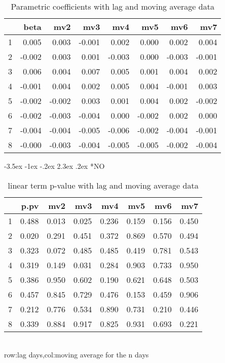 \documentclass[a4paper, 12pt]{article}
\makeatletter
\def\large{\fontsize{14}{20}\selectfont}
\renewcommand\subsection{\@startsection {subsection}{1}{\z@}%
                                   {-3.5ex \@plus -1ex \@minus -.2ex}%
                                   {2.3ex \@plus.2ex}%
                                   {\centering\normalfont\large\bfseries}}
\makeatother
\begin{document}
\begin{table}[h]
\centering
\caption{Parametric coefficients with lag and moving average data}
\begin{tabular}{rrrrrrrr}
  \hline
 & beta & mv2 & mv3 & mv4 & mv5 & mv6 & mv7 \\
  \hline
1 & 0.005 & 0.003 & -0.001 & 0.002 & 0.000 & 0.002 & 0.004 \\
  2 & -0.002 & 0.003 & 0.001 & -0.003 & 0.000 & -0.003 & -0.001 \\
  3 & 0.006 & 0.004 & 0.007 & 0.005 & 0.001 & 0.004 & 0.002 \\
  4 & -0.001 & 0.004 & 0.002 & 0.005 & 0.004 & -0.001 & 0.003 \\
  5 & -0.002 & -0.002 & 0.003 & 0.001 & 0.004 & 0.002 & -0.002 \\
  6 & -0.002 & -0.003 & -0.004 & 0.000 & -0.002 & 0.002 & 0.000 \\
  7 & -0.004 & -0.004 & -0.005 & -0.006 & -0.002 & -0.004 & -0.001 \\
  8 & -0.000 & -0.003 & -0.004 & -0.005 & -0.005 & -0.002 & -0.004 \\
   \hline
\end{tabular}
\end{table}
\clearpage
\subsection*{NO}
\begin{table}[h]
\centering
\caption{linear term p-value with lag and moving average data}
\begin{tabular}{rrrrrrrr}
  \hline
 & p.pv & mv2 & mv3 & mv4 & mv5 & mv6 & mv7 \\
  \hline
1 & 0.488 & 0.013 & 0.025 & 0.236 & 0.159 & 0.156 & 0.450 \\
  2 & 0.020 & 0.291 & 0.451 & 0.372 & 0.869 & 0.570 & 0.494 \\
  3 & 0.323 & 0.072 & 0.485 & 0.485 & 0.419 & 0.781 & 0.543 \\
  4 & 0.319 & 0.149 & 0.031 & 0.284 & 0.903 & 0.733 & 0.950 \\
  5 & 0.386 & 0.950 & 0.602 & 0.190 & 0.621 & 0.648 & 0.503 \\
  6 & 0.457 & 0.845 & 0.729 & 0.476 & 0.153 & 0.459 & 0.906 \\
  7 & 0.212 & 0.776 & 0.534 & 0.890 & 0.731 & 0.210 & 0.446 \\
  8 & 0.339 & 0.884 & 0.917 & 0.825 & 0.931 & 0.693 & 0.221 \\
   \hline
\end{tabular}
\\row:lag days,col:moving average for the n days
\end{table}
\end{document}
